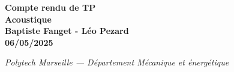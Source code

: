 \vfill

\begin{center}
{\LARGE \textbf{Compte rendu de TP \\ Acoustique}} \\[1em]
\textbf{Baptiste Fanget - Léo Pezard \\
06/05/2025} \\[2em]

\end{center}

\vspace*{\fill} %

\begin{center}
\textit{Polytech Marseille — Département Mécanique et énergétique}
\end{center}

\newpage
